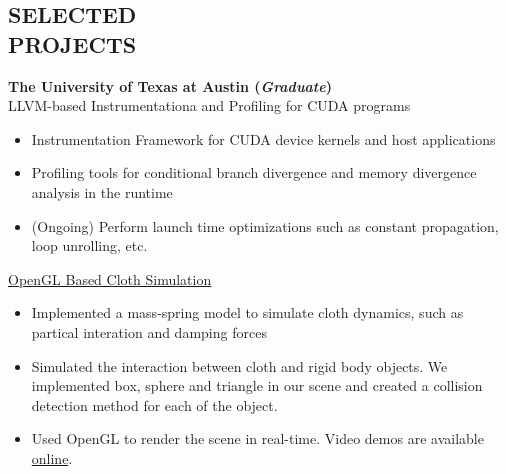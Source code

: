 \documentclass[margin, 9pt]{res} %
\begin{document}
\begin{resume}
\section{SELECTED\\ PROJECTS}

{\large\textbf{The University of Texas at Austin (\textit{Graduate})}}\\

\vspace*{-7pt}
 LLVM-based Instrumentationa and Profiling for CUDA programs\\
\vspace*{-10pt}
\begin{itemize}[leftmargin=*] \itemsep -3pt
\vspace*{-5pt}
	\item Instrumentation Framework for CUDA device kernels and host applications
  \item Profiling tools for conditional branch divergence and memory divergence analysis in the runtime
  \item (Ongoing) Perform launch time optimizations such as constant propagation, loop unrolling, etc.
\end{itemize}

\medskip
\vspace*{-7pt}
\href{http://www.cs.utexas.edu/~wc8348/cs384g/draw.html}{OpenGL Based Cloth Simulation}\\
\vspace*{-10pt}
\begin{itemize}[leftmargin=*] \itemsep -3pt
\vspace*{-5pt}
	\item Implemented a mass-spring model to simulate cloth dynamics, such as partical interation and damping forces
	\item Simulated the interaction between cloth and rigid body objects. We implemented box, sphere and triangle in our scene and created a collision detection method for each of the object.
	\item Used OpenGL to render the scene in real-time. Video demos are available \href{https://www.youtube.com/playlist?list=PLhg5e7MedlDPsw6D1Lg_bPupiMRJJ9fnm&disable_polymer=true}{online}.
\end{itemize}


\end{resume}
\end{document}
